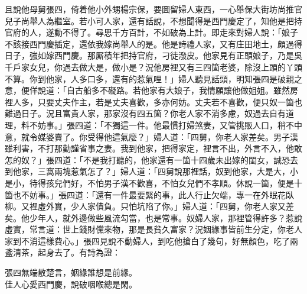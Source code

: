 且說他母舅張四，倚着他小外甥楊宗保，要圖留婦人東西，一心舉保大街坊尚推官兒子尚舉人為繼室。若小可人家，還有話說，不想聞得是西門慶定了，知他是把持官府的人，遂動不得了。尋思千方百計，不如破為上計。即走來對婦人說：「娘子不該接西門慶插定，還依我嫁尚舉人的是。他是詩禮人家，又有庄田地土，頗過得日子，強如嫁西門慶。那厮積年把持官府，刁徒潑皮。{}他家見有正頭娘子，乃是吳千戶家女兒，你過去做大是，做小是？況他房裡又有三四箇老婆，除沒上頭的丫頭不算。你到他家，人多口多，還有的惹氣哩！」婦人聽見話頭，明知張四是破親之意，{}便佯說道：「自古船多不礙路。若他家有大娘子，我情願讓他做姐姐。雖然房裡人多，只要丈夫作主，若是丈夫喜歡，多亦何妨。丈夫若不喜歡，便只奴一箇也難過日子。況且富貴人家，那家沒有四五箇？你老人家不消多慮，奴過去自有道理，料不妨事。」張四道：「不獨這一件。他最慣打婦煞妻，又管挑販人口，稍不中意，就令媒婆賣了。{}你受得他這氣麼？」婦人道：「四舅，你老人家差矣。男子漢雖利害，不打那勤謹省事之妻。我到他家，把得家定，裡言不出，外言不入，他敢怎的奴？」張四道：「不是我打聽的，他家還有一箇十四歲未出嫁的閨女，誠恐去到他家，三窩兩塊惹氣怎了？」{}婦人道：「四舅說那裡話，奴到他家，大是大，小是小，待得孩兒們好，不怕男子漢不歡喜，不怕女兒們不孝順。休說一箇，便是十箇也不妨事。」張四道：「還有一件最要緊的事，此人行止欠端，專一在外眠花臥柳。又裡虛外實，少人家債負。只怕坑陷了你。」婦人道：「四舅，你老人家又差矣。他少年人，就外邊做些風流勾當，也是常事。奴婦人家，那裡管得許多？{}惹說虛實，常言道：世上錢財儻來物，那是長貧久富家？況姻緣事皆前生分定，你老人家到不消這樣費心。」張四見說不動婦人，到吃他搶白了幾句，好無顏色，吃了兩盞清茶，{}起身去了。有詩為證：

\begin{myquote} 
張四無端散楚言，姻緣誰想是前緣。\\佳人心愛西門慶，說破咽喉總是閑。
\end{myquote} 

